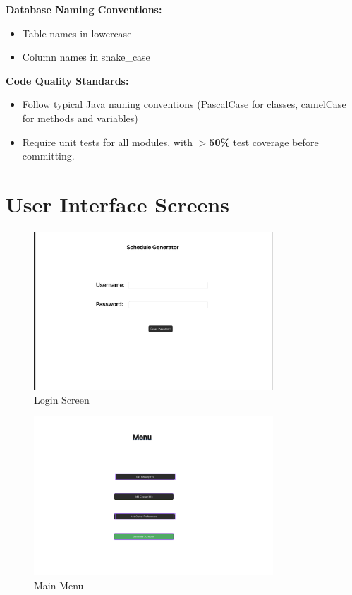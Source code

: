 \documentclass{article}
\begin{document}
\textbf{Database Naming Conventions:}
\begin{itemize}
    \item Table names in lowercase
    \item Column names in snake\_case
\end{itemize}

\textbf{Code Quality Standards:}
\begin{itemize}
    \item Follow typical Java naming conventions (PascalCase for classes, camelCase for methods and variables)
    \item Require unit tests for all modules, with \textbf{$>$50\%} test coverage before committing.
\end{itemize}

\section{User Interface Screens}

\begin{figure}[h]
    \centering
    \includegraphics[width=0.8\textwidth]{photos/photo1.png}
    \caption{Login Screen}
\end{figure}

\begin{figure}[h]
    \centering
    \includegraphics[width=0.8\textwidth]{photos/photo2.png}
    \caption{Main Menu}
\end{figure}
\end{document}
